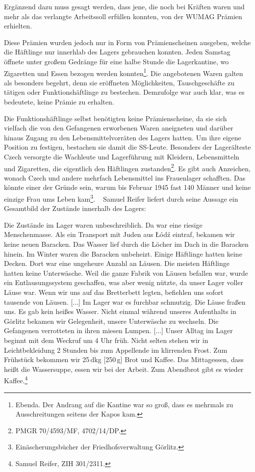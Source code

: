 Ergänzend dazu muss gesagt werden, dass jene, die noch bei Kräften waren und mehr als das verlangte Arbeitssoll erfüllen konnten, von der WUMAG Prämien\label{pramien} erhielten.

Diese Prämien wurden jedoch nur in Form von Prämienscheinen ausgeben, welche die Häftlinge nur innerhlab des Lagers gebrauchen konnten. Jeden Samstag öffnete unter großem Gedränge für eine halbe Stunde die Lagerkantine, wo Zigaretten und Essen bezogen werden konnten\footnote{Ebenda. Der Andrang auf die Kantine war so groß, dass es mehrmals zu Ausschreitungen seitens der Kapos kam.}. Die angebotenen Waren galten als besonders begehrt, denn sie eröffneten Möglichkeiten, Tauschgeschäfte zu tätigen oder Funktionshäftlinge zu bestechen. Demzufolge war auch klar, was es bedeutete, keine Prämie zu erhalten.


Die Funktionshäftlinge selbst benötigten keine Prämienscheine, da sie sich vielfach die von den Gefangenen erworbenen Waren aneigneten und darüber hinaus Zugang zu den Lebensmittelvorräten des Lagers hatten. Um ihre eigene Position zu festigen, bestachen sie damit die SS-Leute. Besonders der Lagerälteste Czech versorgte die Wachleute und Lagerführung mit Kleidern, Lebensmitteln und Zigaretten, die eigentlich den Häftlingen zustanden\footnote{PMGR 70/4593/MF, 4702/14/DP.}. Es gibt auch Anzeichen, wonach Czech und andere mehrfach Lebensmittel ins Frauenlager schafften. Das könnte einer der Gründe sein, warum bis Februar 1945 fast 140 Männer und keine einzige Frau ums Leben kam\footnote{Einäscherungsbücher der Friedhofsverwaltung Görlitz.}.
~\newline
Samuel Reifer liefert durch seine Aussage ein Gesamtbild der Zustände innerhalb des Lagers:
\begin{leftbar}
Die Zustände im Lager waren unbeschreiblich. Da war eine riesige Menschenmasse. Als ein Transport mit Juden aus \L \'od\'z eintraf, bekamen wir keine neuen Baracken. Das Wasser lief durch die Löcher im Dach in die Baracken hinein. Im Winter waren die Baracken unbeheizt. Einige Häftlinge hatten keine Decken. Dort war eine ungeheure Anzahl an Läusen. Die meisten Häftlinge hatten keine Unterwäsche. Weil die ganze Fabrik von Läusen befallen war, wurde ein Entlausungssystem geschaffen, was aber wenig nützte, da unser Lager voller Läuse war. Wenn wir uns auf das Bretterbett legten, befiehlen uns sofort tausende von Läusen.
[...]
Im Lager war es furchbar schmutzig. Die Läuse fraßen uns. Es gab kein heißes Wasser. Nicht einmal während unseres Aufenthalts in Görlitz bekamen wir Gelegenheit, unsere Unterwäsche zu wechseln. Die Gefangenen verrotteten in ihren miesen Lumpen.
[...] \newline
Unser Alltag im Lager beginnt mit dem Weckruf um 4 Uhr früh. Nicht selten stehen wir in Leichtbekleidung 2 Stunden bis zum Appellende im klirrenden Frost. Zum Frühstück bekommen wir 25\,dkg [250\,g] Brot und Kaffee. Das Mittagessen, dass heißt die Wassersuppe, essen wir bei der Arbeit.
Zum Abendbrot gibt es wieder Kaffee.\footnote{Samuel Reifer, ZIH 301/2311.}
\end{leftbar}


